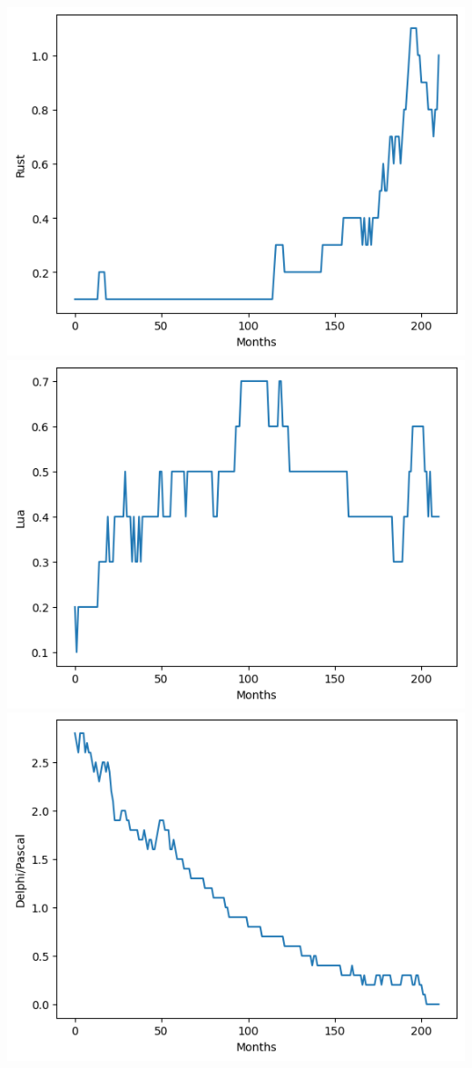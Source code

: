 \documentclass[conference]{IEEEtran}
\begin{document}
\includegraphics[scale=0.4]{lineplot/rust.png}
\includegraphics[scale=0.4]{lineplot/lua.png}
\includegraphics[scale=0.4]{lineplot/pascal.png}
\end{document}

